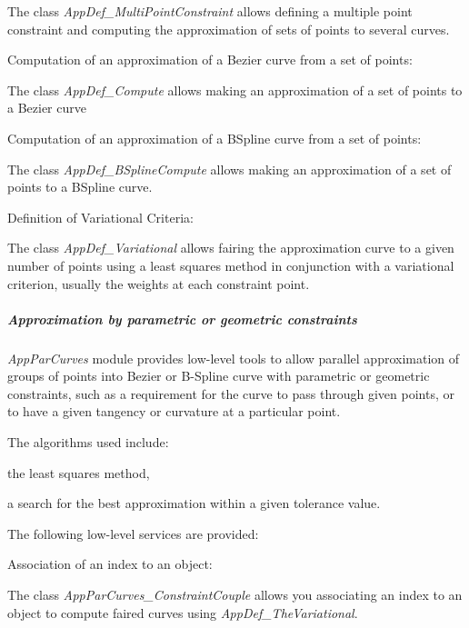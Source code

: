 \begin{DoxyItemize}
The class {\itshape App\+Def\+\_\+\+Multi\+Point\+Constraint} allows defining a multiple point constraint and computing the approximation of sets of points to several curves.
\item Computation of an approximation of a Bezier curve from a set of points\+:

The class {\itshape App\+Def\+\_\+\+Compute} allows making an approximation of a set of points to a Bezier curve
\item Computation of an approximation of a B\+Spline curve from a set of points\+:

The class {\itshape App\+Def\+\_\+\+B\+Spline\+Compute} allows making an approximation of a set of points to a B\+Spline curve.
\item Definition of Variational Criteria\+:
\end{DoxyItemize}

The class {\itshape App\+Def\+\_\+\+Variational} allows fairing the approximation curve to a given number of points using a least squares method in conjunction with a variational criterion, usually the weights at each constraint point.

\subparagraph*{Approximation by parametric or geometric constraints}

{\itshape App\+Par\+Curves} module provides low-\/level tools to allow parallel approximation of groups of points into Bezier or B-\/\+Spline curve with parametric or geometric constraints, such as a requirement for the curve to pass through given points, or to have a given tangency or curvature at a particular point.

The algorithms used include\+:
\begin{DoxyItemize}
\item the least squares method,
\item a search for the best approximation within a given tolerance value.
\end{DoxyItemize}

The following low-\/level services are provided\+:


\begin{DoxyItemize}
\item Association of an index to an object\+:
\end{DoxyItemize}

The class {\itshape App\+Par\+Curves\+\_\+\+Constraint\+Couple} allows you associating an index to an object to compute faired curves using {\itshape App\+Def\+\_\+\+The\+Variational}.


